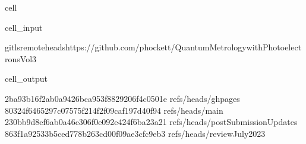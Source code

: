 \documentclass[letterpaper,table,10pt,english]{jupyterBook}
\begin{document}
\begin{sphinxuseclass}{cell}\begin{sphinxVerbatimInput}

\begin{sphinxuseclass}{cell_input}
\begin{sphinxVerbatim}[commandchars=\\\{\}]
gitls\PYGZhy{}remote\PYGZhy{}\PYGZhy{}headshttps://github.com/phockett/Quantum\PYGZhy{}Metrology\PYGZhy{}with\PYGZhy{}Photoelectrons\PYGZhy{}Vol3
\end{sphinxVerbatim}

\end{sphinxuseclass}\end{sphinxVerbatimInput}
\begin{sphinxVerbatimOutput}

\begin{sphinxuseclass}{cell_output}
\begin{sphinxVerbatim}[commandchars=\\\{\}]
2ba93b16f2ab0a9426bca953f8829206f4c0501e	refs/heads/gh\PYGZhy{}pages
80324f6465297c07575f214f2f09caf197d40f94	refs/heads/main
230bb9d8ef6ab0a46c306f0e092e424f6ba23a21	refs/heads/postSubmissionUpdates
863f1a92533b5ced778b263cd00f09ae3cfc9eb3	refs/heads/reviewJuly2023
\end{sphinxVerbatim}

\end{sphinxuseclass}\end{sphinxVerbatimOutput}

\end{sphinxuseclass}
\end{document}
